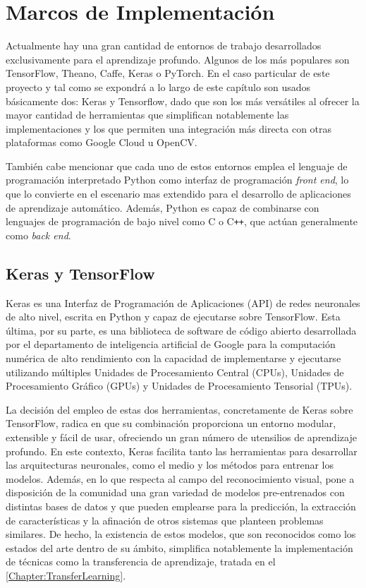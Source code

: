 \renewcommand{\tablename}{Tabla}

\chapter{Marcos de Implementación} \label{Chapter:3}

Actualmente hay una gran cantidad de entornos de trabajo desarrollados exclusivamente para el aprendizaje profundo. Algunos de los más populares son TensorFlow, Theano, Caffe, Keras o PyTorch. En el caso particular de este proyecto y tal como se expondrá a lo largo de este capítulo son usados básicamente dos: Keras y Tensorflow, dado que son los más versátiles al ofrecer la mayor cantidad de herramientas que simplifican notablemente las implementaciones y los que permiten una integración más directa con otras plataformas como Google Cloud u OpenCV.

También cabe mencionar que cada uno de estos entornos emplea el lenguaje de programación interpretado Python como interfaz de programación \textit{front end}, lo que lo convierte en el escenario mas extendido para el desarrollo de aplicaciones de aprendizaje automático. Además, Python es capaz de combinarse con lenguajes de programación de bajo nivel como C o C\texttt{++}, que actúan generalmente como \textit{back end}.

\section{Keras y TensorFlow}

Keras es una Interfaz de Programación de Aplicaciones (API) de redes neuronales de alto nivel, escrita en Python y capaz de ejecutarse sobre TensorFlow. Esta última, por su parte, es una biblioteca de software de código abierto desarrollada por el departamento de inteligencia artificial de Google para la computación numérica de alto rendimiento con la capacidad de implementarse y ejecutarse utilizando múltiples Unidades de Procesamiento Central (CPUs), Unidades de Procesamiento Gráfico (GPUs) y Unidades de Procesamiento Tensorial (TPUs).

La decisión del empleo de estas dos herramientas, concretamente de Keras sobre TensorFlow, radica en que su combinación proporciona un entorno modular, extensible y fácil de usar, ofreciendo un gran número de utensilios de aprendizaje profundo. En este contexto, Keras facilita tanto las herramientas para desarrollar las arquitecturas neuronales, como el medio y los métodos para entrenar los modelos. Además, en lo que respecta al campo del reconocimiento visual, pone a disposición de la comunidad una gran variedad de modelos pre-entrenados con distintas bases de datos y que pueden emplearse para la predicción, la extracción de características y la afinación de otros sistemas que planteen problemas similares. De hecho, la existencia de estos modelos, que son reconocidos como los estados del arte dentro de su ámbito, simplifica notablemente la implementación de técnicas como la transferencia de aprendizaje, tratada en el \autoref{Chapter:TransferLearning}.

